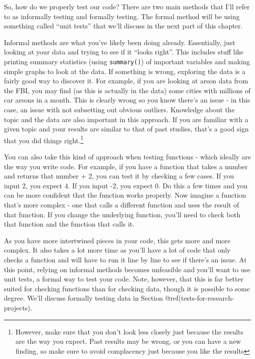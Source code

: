 \documentclass[
  a4paper,
]{krantz}
\begin{document}
So, how do we properly test our code? There are two main
methods that I'll refer to as informally testing and
formally testing. The formal method will be using something
called ``unit tests'' that we'll discuss in the next part of
this chapter.

Informal methods are what you've likely been doing already.
Essentially, just looking at your data and trying to see if
it ``looks right''. This includes stuff like printing
summary statistics (using \texttt{summary()}) of important
variables and making simple graphs to look at the data. If
something is wrong, exploring the data is a fairly good way
to discover it. For example, if you are looking at arson
data from the FBI, you may find (as this is actually in the
data) some cities with millions of car arsons in a month.
This is clearly wrong so you know there's an issue - in this
case, an issue with not subsetting out obvious outliers.
Knowledge about the topic and the data are also important in
this approach. If you are familiar with a given topic and
your results are similar to that of past studies, that's a
good sign that you did things right.\footnote{However, make
  sure that you don't look less closely just because the
  results are the way you expect. Past results may be wrong,
  or you can have a new finding, so make sure to avoid
  complacency just because you like the results}

You can also take this kind of approach when testing
functions - which ideally are the way you write code. For
example, if you have a function that takes a number and
returns that number + 2, you can test it by checking a few
cases. If you input 2, you expect 4. If you input -2, you
expect 0. Do this a few times and you can be more confident
that the function works properly. Now imagine a function
that's more complex - one that calls a different function
and uses the result of that function. If you change the
underlying function, you'll need to check both that function
and the function that calls it.

As you have more intertwined pieces in your code, this gets
more and more complex. It also takes a lot more time as
you'll have a lot of code that only checks a function and
will have to run it line by line to see if there's an issue.
At this point, relying on informal methods becomes
unfeasible and you'll want to use unit tests, a formal way
to test your code. Note, however, that this is far better
suited for checking functions than for checking data, though
it is possible to some degree. We'll discuss formally
testing data in Section @ref(tests-for-research-projects).
\end{document}
